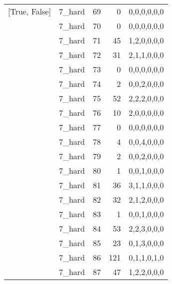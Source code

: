 \begin{tabular}{llrrl}
 [True, False]   & 7\_hard              &            69 &                     0 & 0,0,0,0,0,0   \\
 [True, False]   & 7\_hard              &            70 &                     0 & 0,0,0,0,0,0   \\
 [True, False]   & 7\_hard              &            71 &                    45 & 1,2,0,0,0,0   \\
 [True, False]   & 7\_hard              &            72 &                    31 & 2,1,1,0,0,0   \\
 [True, False]   & 7\_hard              &            73 &                     0 & 0,0,0,0,0,0   \\
 [True, False]   & 7\_hard              &            74 &                     2 & 0,0,2,0,0,0   \\
 [True, False]   & 7\_hard              &            75 &                    52 & 2,2,2,0,0,0   \\
 [True, False]   & 7\_hard              &            76 &                    10 & 2,0,0,0,0,0   \\
 [True, False]   & 7\_hard              &            77 &                     0 & 0,0,0,0,0,0   \\
 [True, False]   & 7\_hard              &            78 &                     4 & 0,0,4,0,0,0   \\
 [True, False]   & 7\_hard              &            79 &                     2 & 0,0,2,0,0,0   \\
 [True, False]   & 7\_hard              &            80 &                     1 & 0,0,1,0,0,0   \\
 [True, False]   & 7\_hard              &            81 &                    36 & 3,1,1,0,0,0   \\
 [True, False]   & 7\_hard              &            82 &                    32 & 2,1,2,0,0,0   \\
 [True, False]   & 7\_hard              &            83 &                     1 & 0,0,1,0,0,0   \\
 [True, False]   & 7\_hard              &            84 &                    53 & 2,2,3,0,0,0   \\
 [True, False]   & 7\_hard              &            85 &                    23 & 0,1,3,0,0,0   \\
 [True, False]   & 7\_hard              &            86 &                   121 & 0,1,1,0,1,0   \\
 [True, False]   & 7\_hard              &            87 &                    47 & 1,2,2,0,0,0   \\

\end{tabular}
